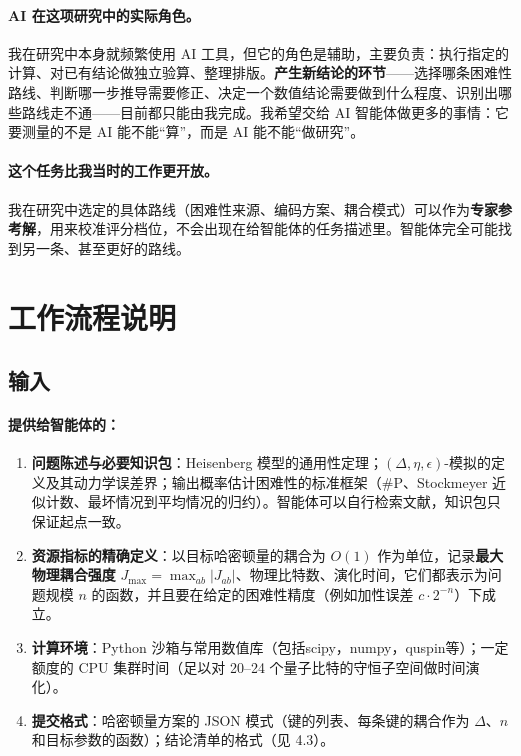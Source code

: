 \documentclass[11pt,a4paper,fontset=none]{ctexart}
\begin{document}
\paragraph{AI 在这项研究中的实际角色。}我在研究中本身就频繁使用 AI 工具，但它的角色是辅助，主要负责：执行指定的计算、对已有结论做独立验算、整理排版。\textbf{产生新结论的环节}——选择哪条困难性路线、判断哪一步推导需要修正、决定一个数值结论需要做到什么程度、识别出哪些路线走不通——目前都只能由我完成。我希望交给 AI 智能体做更多的事情：它要测量的不是 AI 能不能“算”，而是 AI 能不能“做研究”。

\paragraph{这个任务比我当时的工作更开放。}我在研究中选定的具体路线（困难性来源、编码方案、耦合模式）可以作为\textbf{专家参考解}，用来校准评分档位，不会出现在给智能体的任务描述里。智能体完全可能找到另一条、甚至更好的路线。

\section{工作流程说明}

\subsection{输入}

\paragraph{提供给智能体的：}
\begin{enumerate}[label=(\arabic*)]
  \item \textbf{问题陈述与必要知识包}：Heisenberg 模型的通用性定理\cite{CMP2018}；$(\Delta,\eta,\epsilon)$-模拟的定义及其动力学误差界；输出概率估计困难性的标准框架（\#P、Stockmeyer 近似计数、最坏情况到平均情况的归约）。智能体可以自行检索文献，知识包只保证起点一致。
  \item \textbf{资源指标的精确定义}：以目标哈密顿量的耦合为 $O(1)$ 作为单位，记录\textbf{最大物理耦合强度} $J_{\max}=\max_{ab}|J_{ab}|$、物理比特数、演化时间，它们都表示为问题规模 $n$ 的函数，并且要在给定的困难性精度（例如加性误差 $c\cdot 2^{-n}$）下成立。
  \item \textbf{计算环境}：Python 沙箱与常用数值库（包括scipy，numpy，quspin等）；一定额度的 CPU 集群时间（足以对 20--24 个量子比特的守恒子空间做时间演化）。
  \item \textbf{提交格式}：哈密顿量方案的 JSON 模式（键的列表、每条键的耦合作为 $\Delta$、$n$ 和目标参数的函数）；结论清单的格式（见 4.3）。
\end{enumerate}
\end{document}
